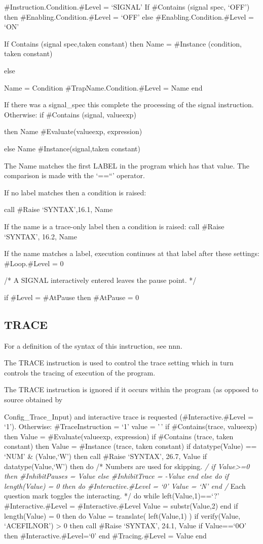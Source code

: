 \#Instruction.Condition.\#Level = `SIGNAL' If \#Contains (signal spec,
`OFF') then \#Enabling.Condition.\#Level = `OFF' else
\#Enabling.Condition.\#Level = `ON'

If Contains (signal spec,taken constant) then Name = \#Instance
(condition, taken constant)

else

Name = Condition \#TrapName.Condition.\#Level = Name end

If there was a signal\_spec this complete the processing of the signal
instruction. Otherwise: if \#Contains (signal, valueexp)

then Name \#Evaluate(valueexp, expression)

else Name \#Instance(signal,taken constant)

The Name matches the first LABEL in the program which has that value.
The comparison is made with the `==``' operator.

If no label matches then a condition is raised:

call \#Raise `SYNTAX',16.1, Name

If the name is a trace-only label then a condition is raised: call
\#Raise `SYNTAX', 16.2, Name

If the name matches a label, execution continues at that label after
these settings: \#Loop.\#Level = 0

/* A SIGNAL interactively entered leaves the pause point. */

if \#Level = \#AtPause then \#AtPause = 0

\hypertarget{trace}{%
\subsection{TRACE}\label{trace}}

For a definition of the syntax of this instruction, see nnn.

The TRACE instruction is used to control the trace setting which in turn
controls the tracing of execution of the program.

The TRACE instruction is ignored if it occurs within the program (as
opposed to source obtained by

Config\_Trace\_Input) and interactive trace is requested
(\#Interactive.\#Level = `1'). Otherwise: \#TraceInstruction = `1' value
= '\,' if \#Contains(trace, valueexp) then Value = \#Evaluate(valueexp,
expression) if \#Contains (trace, taken constant) then Value =
\#Instance (trace, taken constant) if datatype(Value) == `NUM' \&
\datatype(Value,`W') then call \#Raise `SYNTAX', 26.7, Value if
datatype(Value,`W') then do /* Numbers are used for skipping. \emph{/ if
Value\textgreater=0 then \#InhibitPauses = Value else \#InhibitTrace =
-Value end else do if length(Value) = 0 then do \#Interactive.\#Level =
`0' Value = `N' end /} Each question mark toggles the interacting. */ do
while left(Value,1)==`?' \#Interactive.\#Level = \#Interactive.\#Level
Value = substr(Value,2) end if length(Value) = 0 then do Value =
translate( left(Value,1) ) if verify(Value, `ACEFILNOR') \textgreater{}
0 then call \#Raise `SYNTAX', 24.1, Value if Value==`0O' then
\#Interactive.\#Level=`0' end \#Tracing.\#Level = Value end

